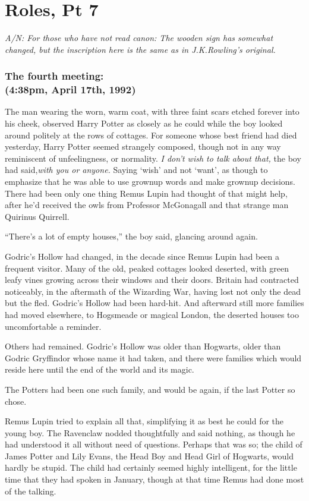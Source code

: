 \chapter{Roles, Pt 7}

\emph{A/N: For those who have not read canon: The wooden sign has somewhat changed, but the inscription here is the same as in J.K.Rowling's original.}
\replacement{\sbreak}{}

\subsection{The fourth meeting:\\ (4:38pm, April 17th, 1992)}

The man wearing the worn, warm coat, with three faint scars etched forever into his cheek, observed Harry Potter as closely as he could while the boy looked around politely at the rows of cottages. For someone whose best friend had died yesterday, Harry Potter seemed strangely composed, though not in any way reminiscent of unfeelingness, or normality. \emph{I don't wish to talk about that,} the boy had said,\emph{with you or anyone.} Saying `wish' and not `want', as though to emphasize that he was able to use grownup words and make grownup decisions. There had been only one thing Remus Lupin had thought of that might help, after he'd received the owls from Professor McGonagall and that strange man Quirinus Quirrell.

“There's a lot of empty houses,” the boy said, glancing around again.

Godric's Hollow had changed, in the decade since Remus Lupin had been a frequent visitor. Many of the old, peaked cottages looked deserted, with green leafy vines growing across their windows and their doors. Britain had contracted noticeably, in the aftermath of the Wizarding War, having lost not only the dead but the fled. Godric's Hollow had been hard-hit. And afterward still more families had moved elsewhere, to Hogsmeade or magical London, the deserted houses too uncomfortable a reminder.

Others had remained. Godric's Hollow was older than Hogwarts, older than Godric Gryffindor whose name it had taken, and there were families which would reside here until the end of the world and its magic.

The Potters had been one such family, and would be again, if the last Potter so chose.

Remus Lupin tried to explain all that, simplifying it as best he could for the young boy. The Ravenclaw nodded thoughtfully and said nothing, as though he had understood it all without need of questions. Perhaps that was so; the child of James Potter and Lily Evans, the Head Boy and Head Girl of Hogwarts, would hardly be stupid. The child had certainly seemed highly intelligent, for the little time that they had spoken in January, though at that time Remus had done most of the talking.

